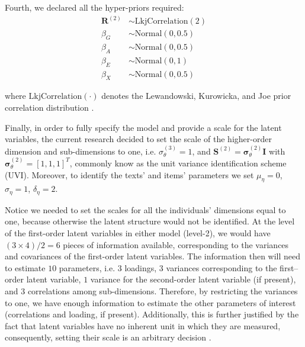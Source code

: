 Fourth, we declared all the hyper-priors required:
%
\begin{align}
	\boldsymbol{R}^{(2)} &\sim \text{LkjCorrelation}( 2 ) \\
	\beta_{G} &\sim \text{Normal}( 0, 0.5 ) \\
	\beta_{A} &\sim \text{Normal}( 0, 0.5 ) \\
	\beta_{E} &\sim \text{Normal}( 0, 1 ) \\
	\beta_{X} &\sim \text{Normal}( 0, 0.5 ) 
\end{align}

\noindent where $\text{LkjCorrelation}(\cdot)$ denotes the Lewandowski, Kurowicka, and Joe prior correlation distribution \cite{Lewandowski_et_al_2009}. 

Finally, in order to fully specify the model and provide a scale for the latent variables, the current research decided to set the scale of the higher-order dimension and sub-dimensions to one, i.e. $\sigma^{(3)}_{\theta} = 1$, and $\mathbf{S}^{(2)} = \pmb{\sigma}^{(2)}_{\theta} \mathbf{I}$ with $\pmb{\sigma}^{(2)}_{\theta} = [1, 1, 1]^{T}$, commonly know as the unit variance identification scheme (UVI). Moreover, to identify the texts' and items' parameters we set $\mu_{\eta} = 0$, $\sigma_{\eta}=1$, $\delta_{\eta}=2$.

Notice we needed to set the scales for all the individuals' dimensions equal to one, because otherwise the latent structure would not be identified. At the level of the first-order latent variables in either model (level-2), we would have $(3 \times 4)/2 = 6$ pieces of information available, corresponding to the variances and covariances of the first-order latent variables. The information then will need to estimate $10$ parameters, i.e. $3$ loadings, $3$ variances corresponding to the first--order latent variable, $1$ variance for the second-order latent variable (if present), and $3$ correlations among sub-dimensions. Therefore, by restricting the variances to one, we have enough information to estimate the other parameters of interest (correlations and loading, if present). Additionally, this is further justified by the fact that latent variables have no inherent unit in which they are measured, consequently, setting their scale is an arbitrary  decision \cite{Beaujean_2014}.


\begin{comment}
On the other hand, from the texts and items perspective, at the level of the items (level-2) we would have $(25 \times 26)/2 = 325$ pieces of information available, corresponding to the variances and covariances of the items dimensions. With that information we would need to estimate $30$ parameters, corresponding to $25$ items' dimension variances, and $5$ texts' dimension variances. notice in this case, we do not need to estimate $25$ loadings, as they are assumed to be $1$.
\end{comment}

